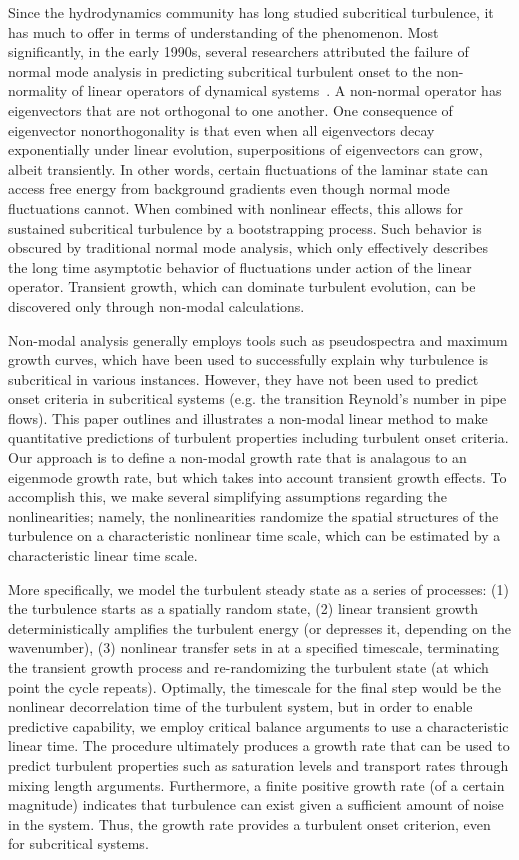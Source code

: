 \documentclass[twocolumn,showkeys,superscriptaddress]{revtex4}
\begin{document}
Since the hydrodynamics community has long studied subcritical turbulence, it has much to offer in terms of understanding of the phenomenon. Most significantly,
in the early 1990s, several researchers attributed the failure of normal mode analysis in predicting subcritical turbulent onset to the non-normality of linear operators of
dynamical systems~\cite{gustavsson1991,butler1992,trefethen1993,reddy1993,henningson1994,schmid2007}. A non-normal operator has 
eigenvectors that are not orthogonal to one another. One consequence of eigenvector nonorthogonality is that even when all eigenvectors decay exponentially under linear evolution, 
superpositions of eigenvectors can grow, albeit transiently.
In other words, certain fluctuations of the laminar state can access free energy from background gradients even though normal mode fluctuations cannot.
When combined with nonlinear effects, this allows for sustained subcritical turbulence by a bootstrapping process.
Such behavior is obscured by traditional normal mode analysis, which only effectively describes the long time asymptotic behavior of fluctuations under  
action of the linear operator. Transient growth, which can dominate turbulent evolution, can be discovered only through non-modal calculations.

Non-modal analysis generally employs tools such as pseudospectra and maximum growth curves, which have been used to successfully explain why turbulence is subcritical in various instances. 
However, they have not been used to predict onset criteria in subcritical systems (e.g. the transition Reynold's number in pipe flows).
This paper outlines and illustrates a non-modal linear method to make quantitative predictions of turbulent properties including turbulent onset criteria. 
Our approach is to define a non-modal growth rate that is analagous to an eigenmode growth rate, but which takes into account transient growth effects. To accomplish this, we make
several simplifying assumptions regarding the nonlinearities; namely, the nonlinearities randomize the spatial structures of the turbulence on a characteristic nonlinear time scale, which can
be estimated by a characteristic linear time scale.

More specifically, we model the turbulent steady state as a series of processes:  (1) the turbulence starts as a spatially random state, 
(2) linear transient growth deterministically amplifies the turbulent energy (or depresses it, depending on the wavenumber), 
(3) nonlinear transfer sets in at a specified timescale, terminating the transient growth process and re-randomizing the turbulent state (at which point the cycle repeats). 
Optimally, the timescale for the final step would be the nonlinear decorrelation time of the turbulent system, but in order to enable predictive capability, we employ critical balance
arguments to use a characteristic linear time. The procedure ultimately produces a growth rate that can be used to predict turbulent properties such as saturation levels and transport rates 
through mixing length arguments. Furthermore, a finite positive growth rate (of a certain magnitude) indicates that turbulence can exist given a sufficient amount of noise in the system.
Thus, the growth rate provides a turbulent onset criterion, even for subcritical systems.
\end{document}
